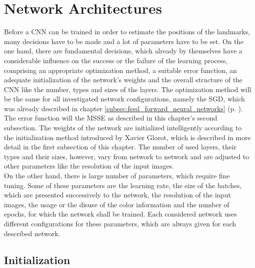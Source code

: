 \documentclass[11pt, a4paper]{article}
\newcommand\myref[1]{\ref{#1} (p. \pageref{#1})}
\begin{document}
\newpage


\section{Network Architectures}
\label{sec:networkarchitectures}

Before a \ac{CNN} can be trained in order to estimate the positions of the landmarks, many decisions have to be made and a lot of parameters have to be set. On the one hand, there are fundamental decisions, which already by themselves have a considerable influence on the success or the failure of the learning process, comprising an appropriate optimization method, a suitable error function, an adequate initialization of the network's weights and the overall structure of the \ac{CNN} like the number, types and sizes of the layers. The optimization method will be the same for all investigated network configurations, namely the \ac{SGD}, which was already described in chapter \myref{subsec:feed_forward_neural_networks}. The error function will the \ac{MSSE} as described in this chapter's second subsection. The weights of the network are initialized intelligently according to the initialization method introduced by Xavier Glorot, which is described in more detail in the first subsection of this chapter. The number of used layers, their types and their sizes, however, vary from network to network and are adjusted to other parameters like the resolution of the input images.\\
On the other hand, there is large number of parameters, which require fine tuning. Some of these parameters are the learning rate, the size of the batches, which are presented successively to the network, the resolution of the input images, the usage or the disuse of the color information and the number of epochs, for which the network shall be trained. Each considered network uses different configurations for these parameters, which are always given for each described network.

\subsection{Initialization}
\label{subsec:glorot_initialization}
\end{document}
